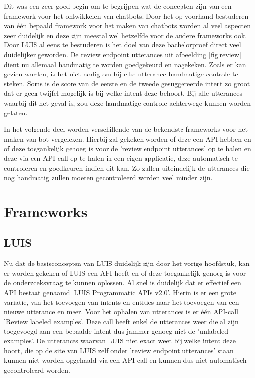 Dit was een zeer goed begin om te begrijpen wat de concepten zijn van een framework voor het ontwikkelen van chatbots. Door het op voorhand bestuderen van één bepaald framework voor het maken van chatbots worden al veel aspecten zeer duidelijk en deze zijn meestal wel hetzelfde voor de andere frameworks ook. Door LUIS al eens te bestuderen is het doel van deze bachelorproef direct veel duidelijker geworden. De review endpoint utterances uit afbeelding \ref{fig:review} dient nu allemaal handmatig te worden goedgekeurd en nagekeken. Zoals er kan gezien worden, is het niet nodig om bij elke utterance handmatige controle te steken. Soms is de score van de eerste en de tweede gesuggereerde intent zo groot dat er geen twijfel mogelijk is bij welke intent deze behoort. Bij alle utterances waarbij dit het geval is, zou deze handmatige controle achterwege kunnen worden gelaten.

In het volgende deel worden verschillende van de bekendste frameworks voor het maken van bot vergeleken. Hierbij zal gekeken worden of deze een API hebben en of deze toegankelijk genoeg is voor de 'review endpoint utterances' op te halen en deze via een API-call op te halen in een eigen applicatie, deze automatisch te controleren en goedkeuren indien dit kan. Zo zullen uiteindelijk de utterances die nog handmatig zullen moeten gecontroleerd worden veel minder zijn.

\section{Frameworks}
\label{sec:Frameworks}

\subsection{LUIS}
\label{Luis}

Nu dat de basisconcepten van LUIS duidelijk zijn door het vorige hoofdstuk, kan er worden gekeken of LUIS een API heeft en of deze toegankelijk genoeg is voor de onderzoeksvraag te kunnen oplossen. Al snel is duidelijk dat er effectief een API bestaat genaamd 'LUIS Programmatic APIs v2.0'. Hierin is er een grote variatie, van het toevoegen van intents en entities naar het toevoegen van een nieuwe utterance en meer. Voor het ophalen van utterances is er één API-call 'Review labeled examples'. Deze call heeft enkel de utterances weer die al zijn toegevoegd aan een bepaalde intent dus jammer genoeg niet de 'unlabeled examples'. De utterances waarvan LUIS niet exact weet bij welke intent deze hoort, die op de site van LUIS zelf onder 'review endpoint utterances' staan kunnen niet worden opgehaald via een API-call en kunnen dus niet automatisch gecontroleerd worden.

